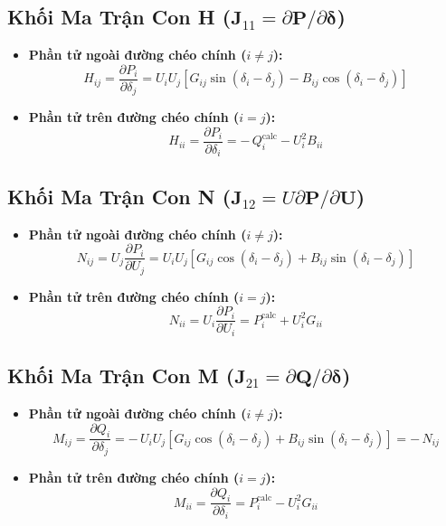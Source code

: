 \documentclass[12pt,a4paper,oneside]{report}
\begin{document}
\subsection{Khối Ma Trận Con H ($\mathbf{J}_{11} = \partial \mathbf{P} / \partial \boldsymbol{\delta}$)}
\begin{itemize}
    \item \textbf{Phần tử ngoài đường chéo chính ($i \ne j$):}
    \begin{equation}
    H_{ij} = \frac{\partial P_i}{\partial \delta_j} = U_i U_j \left[ G_{ij} \sin(\delta_i - \delta_j) - B_{ij} \cos(\delta_i - \delta_j) \right]
    \end{equation}
    \item \textbf{Phần tử trên đường chéo chính ($i = j$):}
    \begin{equation}
    H_{ii} = \frac{\partial P_i}{\partial \delta_i} = -\, Q_i^{\text{calc}} - U_i^2 B_{ii}
    \end{equation}
\end{itemize}

\subsection{Khối Ma Trận Con N ($\mathbf{J}_{12} = U \partial \mathbf{P} / \partial \mathbf{U}$)}
\begin{itemize}
    \item \textbf{Phần tử ngoài đường chéo chính ($i \ne j$):}
    \begin{equation}
    N_{ij} = U_j \frac{\partial P_i}{\partial U_j} = U_i U_j \left[ G_{ij} \cos(\delta_i - \delta_j) + B_{ij} \sin(\delta_i - \delta_j) \right]
    \end{equation}
    \item \textbf{Phần tử trên đường chéo chính ($i = j$):}
    \begin{equation}
    N_{ii} = U_i \frac{\partial P_i}{\partial U_i} = P_i^{\text{calc}} + U_i^2 G_{ii}
    \end{equation}
\end{itemize}

\subsection{Khối Ma Trận Con M ($\mathbf{J}_{21} = \partial \mathbf{Q} / \partial \boldsymbol{\delta}$)}
\begin{itemize}
    \item \textbf{Phần tử ngoài đường chéo chính ($i \ne j$):}
    \begin{equation}
    M_{ij} = \frac{\partial Q_i}{\partial \delta_j} = -\, U_i U_j \left[ G_{ij} \cos(\delta_i - \delta_j) + B_{ij} \sin(\delta_i - \delta_j) \right] = -\, N_{ij}
    \end{equation}
    \item \textbf{Phần tử trên đường chéo chính ($i = j$):}
    \begin{equation}
    M_{ii} = \frac{\partial Q_i}{\partial \delta_i} = P_i^{\text{calc}} - U_i^2 G_{ii}
    \end{equation}
\end{itemize}
\end{document}
